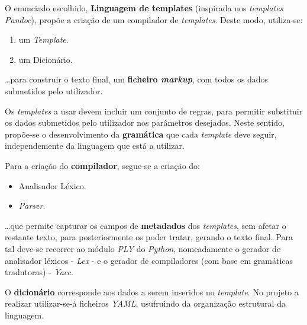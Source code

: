 \documentclass[../relatorio.tex]{subfiles}
\begin{document}
O enunciado escolhido, \textbf{Linguagem de templates} 
(inspirada nos \textit{templates Pandoc}),
propõe a criação de um compilador de \textit{templates}.
Deste modo, utiliza-se:
\begin{enumerate}
    \item um \textit{Template}.
    \item um Dicionário.
\end{enumerate}
\dots para construir o texto final, um \textbf{ficheiro \textit{markup}}, 
com todos os dados submetidos pelo utilizador.  

Os \textit{templates} a usar
devem incluir um conjunto de regras, para permitir 
substituir os dados submetidos pelo utilizador 
nos parâmetros desejados. 
Neste sentido, propõe-se o desenvolvimento da \textbf{gramática}
que cada \textit{template} deve seguir, 
independemente da linguagem que está a utilizar.

Para a criação do \textbf{compilador}, segue-se a criação do:
\begin{itemize}
    \item Analisador Léxico. 
    \item \textit{Parser}.
\end{itemize}
\dots que permite capturar os campos de 
\textbf{metadados} dos \textit{templates}, sem afetar
o restante texto, para posteriormente os poder tratar,
gerando o texto final. 
Para tal deve-se recorrer ao módulo \textit{PLY} do \textit{Python},
nomeadamente o gerador de analisador léxicos - \textit{Lex} - e
o gerador de compiladores (com base em gramáticas tradutoras) - \textit{Yacc}.

O \textbf{dicionário} corresponde aos dados 
a serem inseridos no \textit{template}. 
No projeto a realizar utilizar-se-á ficheiros 
\textit{YAML}, usufruindo da organização 
estrutural da linguagem.
\end{document}
